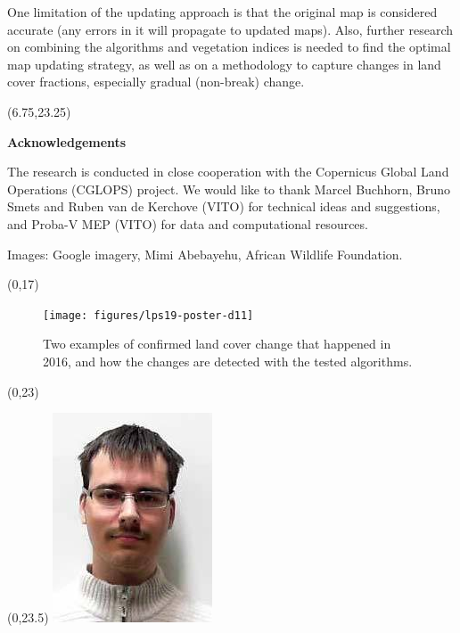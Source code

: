 \documentclass[20pt]{beamer}
\begin{document}
\begin{frame}{}
\begin{textblock}{7}
            One limitation of the updating approach is that the original map is considered accurate (any errors in it will propagate to updated maps). Also, further research on combining the algorithms and vegetation indices is needed to find the optimal map updating strategy, as well as on a methodology to capture changes in land cover fractions, especially gradual (non-break) change.
	\end{textblock}
	
	\begin{textblock}{6}(6.75,23.25)
		\small{\textbf{Acknowledgements}
		
		The research is conducted in close cooperation with the Copernicus Global Land Operations (CGLOPS) project. We would like to thank Marcel Buchhorn, Bruno Smets and Ruben van de Kerchove (VITO) for technical ideas and suggestions, and Proba-V MEP (VITO) for data and computational resources.
		
		Images: Google imagery, Mimi Abebayehu, African Wildlife Foundation.}
		
	\end{textblock}
	

	\begin{textblock}{15}(0,17)
        \begin{figure}
 			\texttt{[image: figures/lps19-poster-d11]}
 			\caption{Two examples of confirmed land cover change that happened in 2016, and how the changes are detected with the tested algorithms.}
 			\label{fig-content}
       \end{figure}
	\end{textblock}	
	
	\begin{textblock}{15}(0,23)
		\Line
	\end{textblock}	
	
	\begin{textblock}{1}(0,23.5)
		\includegraphics[height=1\TPHorizModule]{figures/dainius.jpeg}
	\end{textblock}
	

\end{frame}
\end{document}
